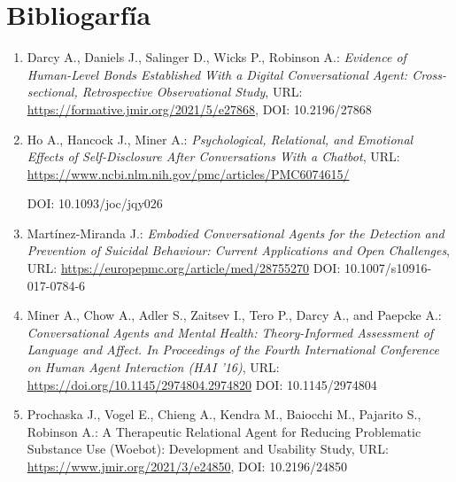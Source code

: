 \documentclass[11pt]{article}
\begin{document}

\newpage

\section{Bibliogarfía}

\begin{enumerate}

\item Darcy A., Daniels J., Salinger D., Wicks P., Robinson A.:
\textit{Evidence of Human-Level Bonds Established With a Digital Conversational Agent: Cross-sectional, Retrospective Observational Study},
URL: \url{https://formative.jmir.org/2021/5/e27868},
DOI: 10.2196/27868

\item Ho A., Hancock J., Miner A.:
\textit{Psychological, Relational, and Emotional Effects of
Self-Disclosure After Conversations With a Chatbot},
URL: \url{https://www.ncbi.nlm.nih.gov/pmc/articles/PMC6074615/}

DOI: 10.1093/joc/jqy026

\item Martínez-Miranda J.: 
\textit{Embodied Conversational Agents for the Detection and 
Prevention of Suicidal Behaviour: 
Current Applications and Open Challenges},
URL: \url{https://europepmc.org/article/med/28755270}
DOI: 10.1007/s10916-017-0784-6

\item Miner A., Chow A., Adler S., Zaitsev I., Tero P., Darcy A., and Paepcke A.:
\textit{Conversational Agents and Mental Health: Theory-Informed Assessment of Language and
Affect. In Proceedings of the Fourth International Conference on Human Agent Interaction (HAI
'16)},
URL: \url{https://doi.org/10.1145/2974804.2974820}
DOI: 10.1145/2974804

\item Prochaska J., Vogel E., Chieng A., Kendra M., Baiocchi M., Pajarito S., Robinson A.:
A Therapeutic Relational Agent for Reducing Problematic Substance Use (Woebot): Development and Usability Study, 
URL: \url{https://www.jmir.org/2021/3/e24850},
DOI: 10.2196/24850
\end{enumerate}
\end{document}
